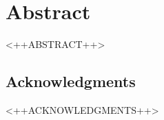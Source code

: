 \chapter*{Abstract} \label{chp:abstract}
<++ABSTRACT++>

\section*{Acknowledgments}
<++ACKNOWLEDGMENTS++>
